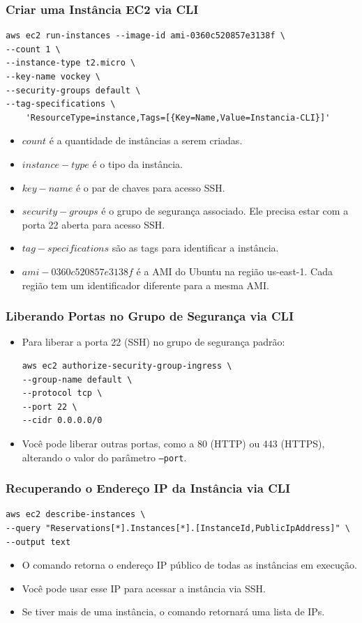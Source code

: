 \documentclass{beamer}
\begin{document}
   \begin{frame}[fragile]
      \frametitle{Criar uma Instância EC2 via CLI}
      \footnotesize
      \begin{verbatim}
aws ec2 run-instances --image-id ami-0360c520857e3138f \
--count 1 \
--instance-type t2.micro \
--key-name vockey \
--security-groups default \
--tag-specifications \
    'ResourceType=instance,Tags=[{Key=Name,Value=Instancia-CLI}]'
      \end{verbatim}
      \begin{itemize}
         \item $count$ é a quantidade de instâncias a serem criadas.
         \item $instance-type$ é o tipo da instância.
         \item $key-name$ é o par de chaves para acesso SSH.
         \item $security-groups$ é o grupo de segurança associado. Ele precisa estar com a porta 22 aberta para acesso SSH.
         \item $tag-specifications$ são as tags para identificar a instância.
         \item $ami-0360c520857e3138f$ é a AMI do Ubuntu na região us-east-1. Cada região tem um identificador diferente para a mesma AMI.
      \end{itemize}
   \end{frame}

   \begin{frame}[fragile]
      \frametitle{Liberando Portas no Grupo de Segurança via CLI}
      \begin{itemize}
         \item Para liberar a porta 22 (SSH) no grupo de segurança padrão:
         \begin{verbatim}
aws ec2 authorize-security-group-ingress \
--group-name default \
--protocol tcp \
--port 22 \
--cidr 0.0.0.0/0
         \end{verbatim}
         \item Você pode liberar outras portas, como a 80 (HTTP) ou 443 (HTTPS), alterando o valor do parâmetro \texttt{--port}.
      \end{itemize}
   \end{frame}

   \begin{frame}[fragile]
      \frametitle{Recuperando o Endereço IP da Instância via CLI}
      \footnotesize 
      \begin{verbatim}
aws ec2 describe-instances \
--query "Reservations[*].Instances[*].[InstanceId,PublicIpAddress]" \
--output text
      \end{verbatim}
      \normalsize
      \begin{itemize}
         \item O comando retorna o endereço IP público de todas as instâncias em execução.
         \item Você pode usar esse IP para acessar a instância via SSH.
         \item Se tiver mais de uma instância, o comando retornará uma lista de IPs.
      \end{itemize}
   \end{frame}
\end{document}
